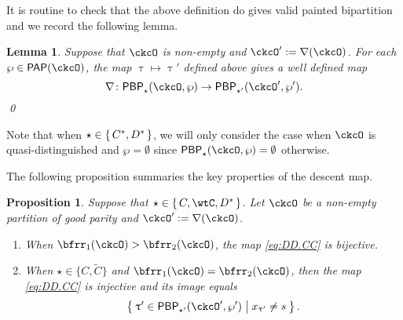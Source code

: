 \documentclass[12pt,a4paper]{amsart}
\def\DD{\nabla}
\numberwithin{equation}{section}
\newtheorem{lem}[thm]{Lemma}
\newtheorem{prop}[thm]{Proposition}
\theoremstyle{remark}
\def\DD{\nabla}
\def\PP{\mathsf{PAP}}
\def\PBP{\mathsf{PBP}}
\def\PBPop#1#2#3#4{\PBP_{#1}^{#2}(#3,#4)}
\newcommand{\PBPOP}[1][]{\PBPop{\star}{#1}{\ckcO}{\wp}}
\def\PBPOPp{\PBPop{\star'}{}{\ckcO'}{\wp'}}
\begin{document}
It is routine to check that the above definition do gives valid painted
bipartition and we record the following lemma.
\begin{lem}
  Suppose that $\ckcO$ is non-empty and $\ckcO' := \DD(\ckcO)$.
  For each $\wp\in \PP(\ckcO)$, the map $\uptau\mapsto \uptau'$ defined above
  gives a well defined map
  \begin{equation}
    \label{eq:DD.CC}
    \DD \colon \PBPOP \rightarrow \PBPOPp.
  \end{equation}
  \qed
\end{lem}

Note that when $\star\in \set{C^{*}, D^{*}}$, we will only consider the case
when $\ckcO$ is quasi-distinguished and $\wp=\emptyset$ since
$\PBPOP = \emptyset $ otherwise.


The following proposition summaries the key properties of the descent map.
\begin{prop} \label{lem:PBPd.C}
  Suppose that $\star\in \set{C,\wtC, D^*}$. Let $\ckcO$ be a non-empty partition of good
  parity and $\ckcO' := \DD(\ckcO)$.
  \begin{enumerate}[label=(\alph*)]
    \item When $\bfrr_1(\ckcO)>\bfrr_2(\ckcO)$,
    the map \eqref{eq:DD.CC} is bijective.
    \item When $\star\in \{C,\widetilde C\}$ and $\bfrr_1(\ckcO)=\bfrr_2(\ckcO)$,
    then the  map \eqref{eq:DD.CC} is injective and its image equals
    \[
      \Set{\uptau'\in \PBPOPp |  x_{\uptau'}\neq s}.
    \]
  \end{enumerate}
\end{prop}
\end{document}
